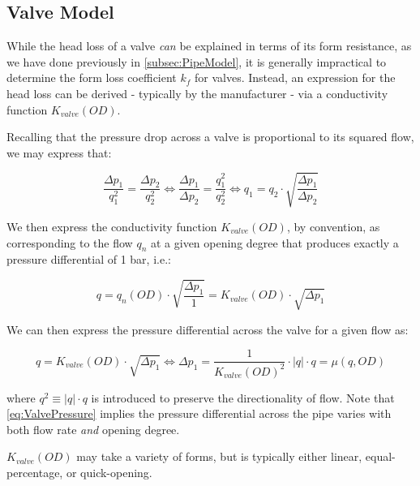 \subsection{Valve Model}\label{subsec:ValveModel}

While the head loss of a valve \textit{can} be explained in terms of its form resistance, as we have done previously in \cref{subsec:PipeModel}, it is generally impractical to determine the form loss coefficient $k_f$ for valves. Instead, an expression for the head loss can be derived - typically by the manufacturer - via a conductivity function $K_{valve}(OD)$.

\smallskip

Recalling that the pressure drop across a valve is proportional to its squared flow, we may express that:

\begin{equation}\label{eq:HydrodynamicRatio}
	\frac{\Delta p_1}{q_1^2} = \frac{\Delta p_2}{q_2^2} \Leftrightarrow 
	\frac{\Delta p_1}{\Delta p_2} = \frac{q_1^2}{q_2^2}
	\Leftrightarrow
	q_1 = q_2\cdot\sqrt{\frac{\Delta p_1}{\Delta p_2}}
\end{equation}

We then express the conductivity function $K_{valve}(OD)$, by convention, as corresponding to the flow $q_n$ at a given opening degree that produces exactly a pressure differential of 1 bar, i.e.:

\begin{equation}\label{eq:Kvalve}
	q = q_n(OD)\cdot\sqrt{\frac{\Delta p_1}{1}} = K_{valve}(OD)\cdot\sqrt{\Delta p_1}
\end{equation}

We can then express the pressure differential across the valve for a given flow as:

\begin{equation}\label{eq:ValvePressure}
	 q = K_{valve}(OD)\cdot\sqrt{\Delta p_1}
	 \Leftrightarrow
	 \Delta p_1 = \frac{1}{K_{valve}(OD)^2} \cdot |q|\cdot q = \mu(q,OD)
\end{equation}

where $q^2 \equiv |q|\cdot q$ is introduced to preserve the directionality of flow. Note that \cref{eq:ValvePressure} implies the pressure differential across the pipe varies with both flow rate \textit{and} opening degree.

\smallskip

$K_{valve}(OD)$ may take a variety of forms, but is typically either linear, equal-percentage, or quick-opening.

